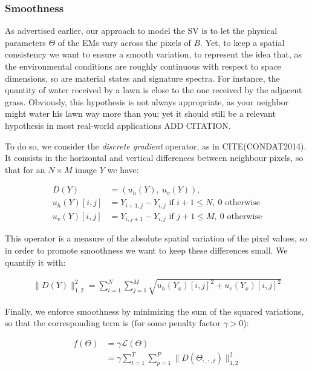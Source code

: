 \documentclass{article}
\begin{document}
\subsubsection{Smoothness}\label{sec:EM-smoothness}

As advertised earlier, our approach to model the SV is to let the physical parameters $\Theta$ of the EMs vary across the pixels of $B$. Yet, to keep a spatial consistency we want to ensure a smooth variation, to represent the idea that, as the environmental conditions are roughly continuous with respect to space dimensions, so are material states and signature spectra. For instance, the quantity of water received by a lawn is close to the one received by the adjacent grass. Obviously, this hypothesis is not always appropriate, as your neighbor might water his lawn way more than you; yet it should still be a relevant hypothesis in most real-world applications ADD CITATION.

To do so, we consider the \emph{discrete gradient} operator, as in CITE(CONDAT2014). It consists in the horizontal and vertical differences between neighbour pixels, so that for an $N \times M$ image $Y$ we have:

\begin{align*}\label{eq:discrete-grad}
  D(Y) &= (u_h (Y),\ u_v (Y)),\\
  u_h (Y) [i, j] &= Y_{i+1, j} - Y_{i, j} \text{ if }i + 1 \leq N,\ 0 \text{ otherwise}\\
  u_v (Y) [i, j] &= Y_{i, j+1} - Y_{i, j} \text{ if }j + 1 \leq M,\ 0 \text{ otherwise}
\end{align*}

This operator is a measure of the absolute spatial variation of the pixel values, so in order to promote smoothness we want to keep these differences small. We quantify it with:

\begin{align*}
  \| D(Y) \|_{1,2}^2 = \sum_{i=1}^N \sum_{j=1}^M \sqrt{ u_h (Y_{x})[i, j]^2 + u_v (Y_x)[i, j]^2 }
\end{align*}

Finally, we enforce smoothness by minimizing the sum of the squared variations, so that the corresponding term is (for some penalty factor $\gamma >0$):

\begin{align}\label{eq:f}
  f(\Theta) &= \gamma \mathcal{L}(\Theta)\\
  &= \gamma \sum_{t = 1}^{T} \sum_{p = 1}^P \| D(\Theta_{:,:,t}) \|_{1,2}^2
\end{align}
\end{document}
